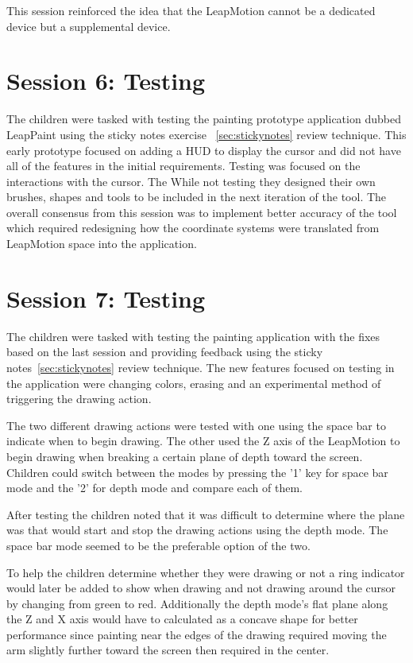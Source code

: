 This session reinforced the idea that the LeapMotion cannot be a dedicated device but a supplemental device.

\section{Session 6: Testing}\label{session6}


The children were tasked with testing the painting prototype application dubbed LeapPaint using the sticky notes exercise ~\ref{sec:stickynotes} review technique. This early prototype focused on adding a HUD to display the cursor and did not have all of the features in the initial requirements. Testing was focused on the interactions with the cursor. The While not testing they designed their own brushes, shapes and tools to be included in the next iteration of the tool. The overall consensus from this session was to implement better accuracy of the tool which required redesigning how the coordinate systems were translated from LeapMotion space into the application. 


\section{Session 7: Testing}\label{session7}


The children were tasked with testing the painting application with the fixes based on the last session and providing feedback using the sticky notes~\ref{sec:stickynotes} review technique. The new features focused on testing in the application were changing colors, erasing and an experimental method of triggering the drawing action. 

The two different drawing actions were tested with one using the space bar to indicate when to begin drawing. The other used the Z axis of the LeapMotion to begin drawing when breaking a certain plane of depth toward the screen. Children could switch between the modes by pressing the '1' key for space bar mode and the '2' for depth mode and compare each of them.

After testing the children noted that it was difficult to determine where the plane was that would start and stop the drawing actions using the depth mode. The space bar mode seemed to be the preferable option of the two. 

To help the children determine whether they were drawing or not a ring indicator would later be added to show when drawing and not drawing around the cursor by changing from green to red. Additionally the depth mode's flat plane along the Z and X axis would have to calculated as a concave shape for better performance since painting near the edges of the drawing required moving the arm slightly further toward the screen then required in the center. 


